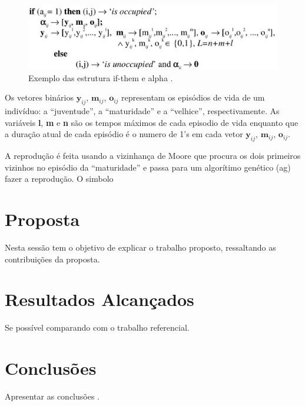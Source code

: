 \documentclass[12pt]{article}
\begin{document}
\begin{figure}[!hb]
\centering
\includegraphics[width=.5\textwidth]{imagens/estrutura-alpha}
\caption{Exemplo das estrutura if-them e alpha \cite{dzwinel:04}.}
\label{fig:estrutura-alpha}
\end{figure}

Os vetores binários $\textbf{y}_{ij}$, $\textbf{m}_{ij}$, $\textbf{o}_{ij}$
representam os episódios de vida de um indivíduo: a ``juventude'', a 
``maturidade'' e a ``velhice'', respectivamente. As variáveis \textbf{l},
\textbf{m} e \textbf{n} são os tempos máximos de cada episodio de vida
enquanto que a duração atual de cada episódio é o numero de 1's em cada vetor
$\textbf{y}_{ij}$, $\textbf{m}_{ij}$, $\textbf{o}_{ij}$.

A reprodução é feita usando a vizinhança de Moore que procura os dois
primeiros vizinhos no episódio da ``maturidade'' e passa para um algorítimo
genético (ag) fazer a reprodução. O simbolo


\section{Proposta}

Nesta sessão tem o objetivo de explicar o trabalho proposto, ressaltando as
contribuições da proposta.


\section{Resultados Alcançados}

Se possível comparando com o trabalho referencial.

\section{Conclusões}

Apresentar as conclusões  \cite{dzwinel:04}.

\end{document}

